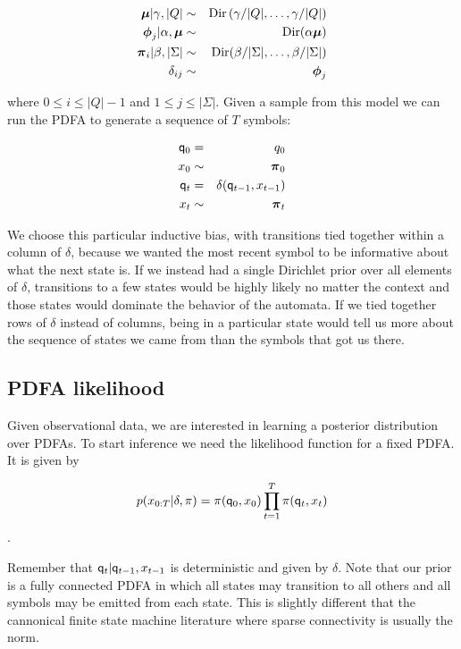 \begin{eqnarray}
\bmu|\gamma,|Q| & \sim & \mathrm{Dir}\left(\gamma/|Q|,\ldots,\gamma/|Q|\right) \label{gen:mu} \\
\bphi_{j}|\alpha,\bmu  & \sim & \mathrm{Dir}(\alpha\bmu) \label{gen:phi} \\
\bpi_{i}|\beta,|\Sigma| & \sim & \mathrm{Dir}(\beta/|\Sigma|,\ldots,\beta/|\Sigma|) \label{gen:pi}\\
\delta_{ij} & \sim & \bphi_{j} \label{gen:delta}
\end{eqnarray}

where $0 \leq i \leq |Q|-1$ and $1 \leq j \leq |\Sigma|$.  Given a sample from this model we can run the PDFA to generate a sequence of $T$ symbols:

\begin{eqnarray}
\q_0 & = & q_0 \label{gen:q0} \\
x_0 & \sim & \bpi_0 \label{gen:x0} \\
\q_t & = & \delta(\q_{t-1},x_{t-1}) \label{gen:q} \\
x_t & \sim & \bpi_t \label{gen:x}
\end{eqnarray}

We choose this particular inductive bias, with transitions tied together within a column of $\delta$, because we wanted the most recent symbol to be informative about what the next state is.  If we instead had a single Dirichlet prior over all elements of $\delta$, transitions to a few states would be highly likely no matter the context and those states would dominate the behavior of the automata.  If we tied together rows of $\delta$ instead of columns, being in a particular state would tell us more about the sequence of states we came from than the symbols that got us there.  

\subsection{PDFA likelihood}

Given observational data, we are interested in learning a posterior distribution over PDFAs.  To start inference we need the likelihood function for a fixed PDFA. It is given by 

\[ p(x_{0:T}|\delta,\pi) = \pi(\q_0,x_0)\prod_{t=1}^T \pi(\q_t,x_t) \label{x:def} \].

Remember that $\q_t | \q_{t-1}, x_{t-1}$ is deterministic and given by $\delta$.  Note that our prior is a fully connected PDFA in which all states may transition to all others and all symbols may be emitted from each state.  This is slightly different that the cannonical finite state machine literature where sparse connectivity is usually the norm.


